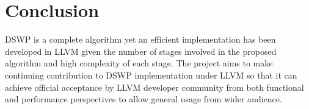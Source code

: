 \documentclass[letterpaper, 10 pt, conference]{ieeeconf}  %
\begin{document}

\section{Conclusion}

DSWP is a complete algorithm yet an efficient implementation has been developed in LLVM given the number of stages involved in the proposed algorithm and high complexity of each stage\cite{c3}. The project aims to make continuing contribution to DSWP implementation under LLVM so that it can achieve official acceptance by LLVM developer community from both functional and performance perspectives to allow general usage from wider audience. 


\addtolength{\textheight}{-12cm}   %







\end{document}
